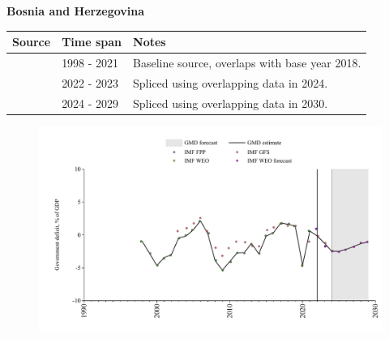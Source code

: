 \documentclass[12pt,a4paper,landscape]{article}
\begin{document}
\begin{adjustbox}{max totalsize={\paperwidth}{\paperheight},center}
\begin{minipage}[t][\textheight][t]{\textwidth}
\vspace*{0.5cm}
{}
\begin{center}
{\Large\bfseries Bosnia and Herzegovina}
\end{center}
\vspace{0.5cm}
\begin{table}[H]
\centering
\small
\begin{tabular}{|l|l|l|}
\hline
\textbf{Source} & \textbf{Time span} & \textbf{Notes} \\
\hline
\rowcolor{white}\cite{IMF_WEO}& 1998 - 2021 &Baseline source, overlaps with base year 2018.\\
\rowcolor{lightgray}\cite{IMF_GFS}& 2022 - 2023 &Spliced using overlapping data in 2024.\\
\rowcolor{white}\cite{IMF_WEO_forecast}& 2024 - 2029 &Spliced using overlapping data in 2030.\\
\hline
\end{tabular}
\end{table}
\begin{figure}[H]
\centering
\includegraphics[width=\textwidth,height=0.6\textheight,keepaspectratio]{graphs/BIH_govdef_GDP.pdf}
\end{figure}
\end{minipage}
\end{adjustbox}
\end{document}
